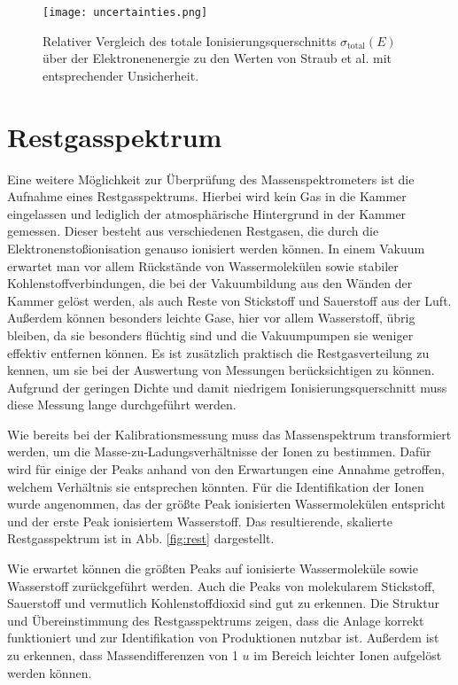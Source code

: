\begin{figure}
    \centering
    \texttt{[image: uncertainties.png]}
    \caption[Relativer Vergleich des totalen Ionisierungsquerschnitts mit Straub et al.]{Relativer Vergleich des totale Ionisierungsquerschnitts $\sigma_\text{total}(E)$ über der Elektronenenergie zu den Werten von Straub et al. \cite{Straub} mit entsprechender Unsicherheit.}
    \label{fig:uncertainties}
\end{figure}

\section{Restgasspektrum}
\label{sec:Restgasspektrum}
Eine weitere Möglichkeit zur Überprüfung des Massenspektrometers ist die Aufnahme eines Restgasspektrums. Hierbei wird kein Gas in die Kammer eingelassen und lediglich der atmosphärische Hintergrund in der Kammer gemessen. Dieser besteht aus verschiedenen Restgasen, die durch die Elektronenstoßionisation genauso ionisiert werden können. In einem Vakuum erwartet man vor allem Rückstände von Wassermolekülen sowie stabiler Kohlenstoffverbindungen, die bei der Vakuumbildung aus den Wänden der Kammer gelöst werden, als auch Reste von Stickstoff und Sauerstoff aus der Luft. Außerdem können besonders leichte Gase, hier vor allem Wasserstoff, übrig bleiben, da sie besonders flüchtig sind und die Vakuumpumpen sie weniger effektiv entfernen können. Es ist zusätzlich praktisch die Restgasverteilung zu kennen, um sie bei der Auswertung von Messungen berücksichtigen zu können. Aufgrund der geringen Dichte und damit niedrigem Ionisierungsquerschnitt muss diese Messung lange durchgeführt werden. 

Wie bereits bei der Kalibrationsmessung muss das Massenspektrum transformiert werden, um die Masse-zu-Ladungsverhältnisse der Ionen zu bestimmen. Dafür wird für einige der Peaks anhand von den Erwartungen eine Annahme getroffen, welchem Verhältnis sie entsprechen könnten. Für die Identifikation der Ionen wurde angenommen, das der größte Peak ionisierten Wassermolekülen
entspricht und der erste Peak ionisiertem Wasserstoff. Das resultierende, skalierte Restgasspektrum ist in Abb. \ref{fig:rest} dargestellt.

Wie erwartet können die größten Peaks auf ionisierte Wassermoleküle sowie Wasserstoff zurückgeführt werden. Auch die Peaks von molekularem Stickstoff, Sauerstoff und vermutlich Kohlenstoffdioxid sind gut zu erkennen. Die Struktur und Übereinstimmung des Restgasspektrums zeigen, dass die Anlage korrekt funktioniert und zur Identifikation von Produktionen nutzbar ist. Außerdem ist zu erkennen, dass Massendifferenzen von 1 $u$ im Bereich leichter Ionen aufgelöst werden können. 

